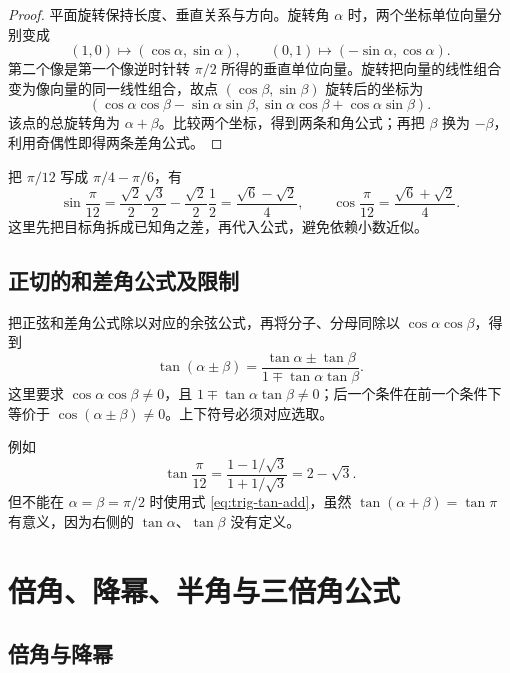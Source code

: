 \documentclass[UTF8,12pt,a4paper,fontset=fandol]{ctexart}
\begin{document}
\begin{proof}
平面旋转保持长度、垂直关系与方向。旋转角 $\alpha$ 时，两个坐标单位向量分别变成
\[
  (1,0)\longmapsto(\cos\alpha,\sin\alpha),\qquad
  (0,1)\longmapsto(-\sin\alpha,\cos\alpha).
\]
第二个像是第一个像逆时针转 $\pi/2$ 所得的垂直单位向量。旋转把向量的线性组合变为像向量的同一线性组合，故点 $(\cos\beta,\sin\beta)$ 旋转后的坐标为
\[
  (\cos\alpha\cos\beta-\sin\alpha\sin\beta,
    \sin\alpha\cos\beta+\cos\alpha\sin\beta).
\]
该点的总旋转角为 $\alpha+\beta$。比较两个坐标，得到两条和角公式；再把 $\beta$ 换为 $-\beta$，利用奇偶性即得两条差角公式。
\end{proof}

\begin{example}[求非基本特殊角的精确值]
把 $\pi/12$ 写成 $\pi/4-\pi/6$，有
\[
  \sin\frac\pi{12}
  =\frac{\sqrt2}{2}\frac{\sqrt3}{2}
   -\frac{\sqrt2}{2}\frac12
  =\frac{\sqrt6-\sqrt2}{4},\qquad
  \cos\frac\pi{12}=\frac{\sqrt6+\sqrt2}{4}.
\]
这里先把目标角拆成已知角之差，再代入公式，避免依赖小数近似。
\end{example}

\subsection{正切的和差角公式及限制}

把正弦和差角公式除以对应的余弦公式，再将分子、分母同除以 $\cos\alpha\cos\beta$，得到
\begin{equation}\label{eq:trig-tan-add}
  \boxed{\tan(\alpha\pm\beta)
  =\frac{\tan\alpha\pm\tan\beta}{1\mp\tan\alpha\tan\beta}}.
\end{equation}
这里要求 $\cos\alpha\cos\beta\ne0$，且 $1\mp\tan\alpha\tan\beta\ne0$；后一个条件在前一个条件下等价于 $\cos(\alpha\pm\beta)\ne0$。上下符号必须对应选取。

例如
\[
  \tan\frac\pi{12}
  =\frac{1-1/\sqrt3}{1+1/\sqrt3}=2-\sqrt3.
\]
但不能在 $\alpha=\beta=\pi/2$ 时使用式 \eqref{eq:trig-tan-add}，虽然 $\tan(\alpha+\beta)=\tan\pi$ 有意义，因为右侧的 $\tan\alpha$、$\tan\beta$ 没有定义。

\section{倍角、降幂、半角与三倍角公式}
\label{sec:trig-multiple}

\subsection{倍角与降幂}
\end{document}
